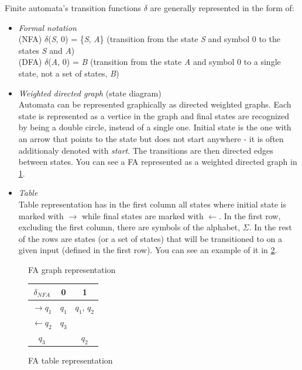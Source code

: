 Finite automata's transition functions $\delta$ are generally represented in the form of:
\begin{itemize}
    \item \textit{Formal notation}\\
    (NFA) $\delta$(\textit{S}, 0) = \{\textit{S}, \textit{A}\} (transition from the state \textit{S} and symbol 0 to the states \textit{S} and \textit{A})\\
    (DFA) $\delta$(\textit{A}, 0) = \textit{B} (transition from the state \textit{A} and symbol 0 to a single state, not a set of states, \textit{B})
    \item \textit{Weighted directed graph} (state diagram)\\
    Automata can be represented graphically as directed weighted graphs. Each state is represented as a vertice in the graph and final states are recognized by being a double circle, instead of a single one. Initial state is the one with an arrow that points to the state but does not start anywhere - it is often additionaly denoted with \textit{start}. The transitions are then directed edges between states. You can see a FA represented as a weighted directed graph in \ref{graph-representation}.
    \item \textit{Table}\\
    Table representation has in the first column all states where initial state is marked with $\rightarrow$ while final states are marked with $\leftarrow$. In the first row, excluding the first column, there are symbols of the alphabet, $\Sigma$. In the rest of the rows are states (or a set of states) that will be transitioned to on a given input (defined in the first row). You can see an example of it in \ref{table-representation}.
\end{itemize}
\begin{figure}
\caption{FA graph representation}\label{graph-representation}
\end{figure}
\begin{figure}
\begin{tabular}{||c|c|c||} 
    \hline
    $\delta_{NFA}$ & 0 & 1 \\ [0.5ex] 
    \hline\hline
    $\rightarrow \textit{q}_1$ & $\textit{q}_1$ & $\textit{q}_1$, $\textit{q}_2$ \\ 
    \hline
    $\leftarrow \textit{q}_2$ & $\textit{q}_3$ & \\
    \hline
    $\textit{q}_3$ &  & $\textit{q}_2$ \\
    \hline
\end{tabular}
\caption{FA table representation}\label{table-representation}
\end{figure}
